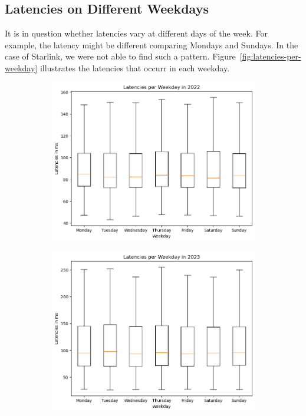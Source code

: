 \subsection{Latencies on Different Weekdays}
\label{sec:latency-weekdays}

It is in question whether latencies vary at different days of the week. For
example, the latency might be different comparing Mondays and Sundays. In the
case of Starlink, we were not able to find such a pattern.
Figure~\ref{fig:latencies-per-weekday} illustrates the latencies that occurr in
each weekday.

\begin{figure}
	\centering
	\begin{subfigure}[b]{0.32\linewidth}
		\includegraphics[width=\linewidth]{chapters/4-results/latency/img/latency_2022_weekdays.png}
	\end{subfigure}
	\begin{subfigure}[b]{0.32\linewidth}
		\includegraphics[width=\linewidth]{chapters/4-results/latency/img/latency_2023_weekdays.png}

\end{subfigure}
\end{figure}
